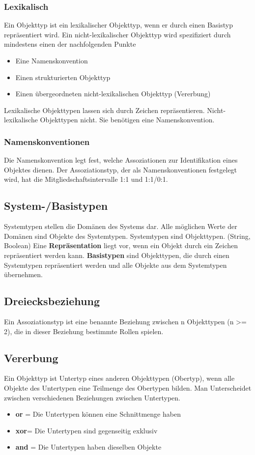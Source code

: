\documentclass[a4paper,10pt]{scrartcl}
\begin{document}
\subsubsection{Lexikalisch}
Ein Objekttyp ist ein lexikalischer Objekttyp, wenn er durch einen Basistyp repräsentiert wird. 
Ein nicht-lexikalischer Objekttyp wird spezifiziert durch mindestens einen der nachfolgenden Punkte
\begin{itemize}
    \item Eine Namenskonvention
    \item Einen strukturierten Objekttyp
    \item Einen übergeordneten nicht-lexikalischen Objekttyp (Vererbung)
\end{itemize}
Lexikalische Objekttypen lassen sich durch Zeichen repräsentieren. 
Nicht-lexikalische Objekttypen nicht. Sie benötigen eine Namenskonvention.
\subsubsection{Namenskonventionen}
Die Namenskonvention legt fest, welche Assoziationen zur Identifikation eines Objektes dienen.
Der Assoziationstyp, der als Namenskonventionen festgelegt wird, hat die Mitgliedschaftsintervalle 1:1 und 1:1/0:1.
\subsection{System-/Basistypen}
Systemtypen stellen die Domänen des Systems dar. Alle möglichen Werte der Domänen sind Objekte des Systemtypen. 
Systemtypen sind Objekttypen. (String, Boolean)\newline  
Eine \textbf{Repräsentation} liegt vor, wenn ein Objekt durch ein Zeichen repräsentiert werden kann.  
\textbf{Basistypen} sind Objekttypen, die durch einen Systemtypen repräsentiert werden und alle Objekte aus dem Systemtypen übernehmen.
\subsection{Dreiecksbeziehung}
Ein Assoziationstyp ist eine benannte Beziehung zwischen n Objekttypen (n >= 2), die in dieser Beziehung bestimmte Rollen spielen.

\subsection{Vererbung}
Ein Objekttyp ist Untertyp eines anderen Objekttypen (Obertyp), wenn alle Objekte des Untertypen eine Teilmenge des Obertypen bilden. Man Unterscheidet zwischen verschiedenen Beziehungen zwischen Untertypen.
\begin{itemize}
    \item \textbf{or} = Die Untertypen können eine Schnittmenge haben
    \item \textbf{xor}= Die Untertypen sind gegenseitig exklusiv
    \item \textbf{and} = Die Untertypen haben dieselben Objekte
\end{itemize}
\end{document}
